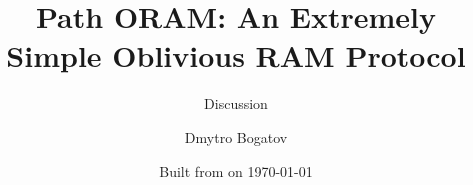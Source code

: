 
\title{Path ORAM: An Extremely Simple Oblivious RAM Protocol} %

\subtitle{Discussion}

\date{Built from \textit{} on \today}

\author{Dmytro Bogatov}


